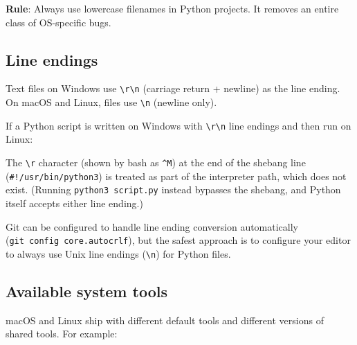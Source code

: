 \textbf{Rule}: Always use lowercase filenames in Python projects. It removes an entire class of OS-specific bugs.

\subsection*{Line endings}\label{07-environment-drift:line-endings}

Text files on Windows use \texttt{\textbackslash{}r\textbackslash{}n} (carriage return + newline) as the line ending. On macOS and Linux, files use \texttt{\textbackslash{}n} (newline only).

If a Python script is written on Windows with \texttt{\textbackslash{}r\textbackslash{}n} line endings and then run on Linux:

\begin{codebox}[short]

\begin{Shaded}
\begin{Highlighting}[]
\end{Highlighting}
\end{Shaded}

\end{codebox}

\noindent{}The \texttt{\textbackslash{}r} character (shown by bash as \texttt{\^{}M}) at the end of the shebang line (\texttt{\#!/}\allowbreak{}\texttt{usr/}\allowbreak{}\texttt{bin/}\allowbreak{}\texttt{python3}) is treated as part of the interpreter path, which does not exist. (Running \texttt{python3\ script.py} instead bypasses the shebang, and Python itself accepts either line ending.)

Git can be configured to handle line ending conversion automatically (\texttt{git\ config\ core.}\allowbreak{}\texttt{autocrlf}), but the safest approach is to configure your editor to always use Unix line endings (\texttt{\textbackslash{}n}) for Python files.

\subsection*{Available system tools}\label{07-environment-drift:available-system-tools}

macOS and Linux ship with different default tools and different versions of shared tools. For example:

